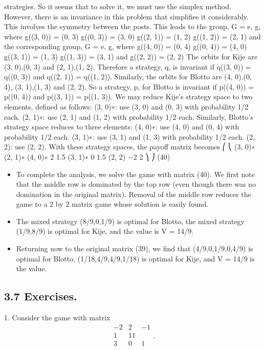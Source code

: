\documentclass[]{report}
\begin{document}
strategies. So it seems that to solve it, we must use the simplex method. However, there is
an invariance in this problem that simplifies it considerably. This involves the symmetry
between the posts. This leads to the group, G = {e, g}, where
g((3, 0)) = (0, 3) g((0, 3)) = (3, 0) g((2, 1)) = (1, 2) g((1, 2)) = (2, 1)
and the corresponding group, G = {e, g}, where
g((4, 0)) = (0, 4) g((0, 4)) = (4, 0) g((3, 1)) = (1, 3) g((1, 3)) = (3, 1)
and g((2, 2)) = (2, 2)
The orbits for Kije are {(3, 0),(0, 3)} and {(2, 1),(1, 2)}. Therefore a strategy, q, is
invariant if q((3, 0)) = q((0, 3)) and q((2, 1)) = q((1, 2)). Similarly, the orbits for Blotto
are {(4, 0),(0, 4)}, {(3, 1),(1, 3)} and {(2, 2)}. So a strategy, p, for Blotto is invariant if
p((4, 0)) = p((0, 4)) and p((3, 1)) = p((1, 3)).
We may reduce Kije’s strategy space to two elements, defined as follows:
(3, 0)∗: use (3, 0) and (0, 3) with probability 1/2 each.
(2, 1)∗: use (2, 1) and (1, 2) with probability 1/2 each.
Similarly, Blotto’s strategy space reduces to three elements:
(4, 0)∗: use (4, 0) and (0, 4) with probability 1/2 each.
(3, 1)∗: use (3, 1) and (1, 3) with probability 1/2 each.
(2, 2): use (2, 2).
With these strategy spaces, the payoff matrix becomes
⎛
⎝
(3, 0)∗ (2, 1)∗
(4, 0)∗ 2 1.5
(3, 1)∗ 0 1.5
(2, 2) −2 2
⎞
⎠ (40)
\begin{itemize}
\itemAs an example of the computations used to arrive at these payoffs, consider the upper
left entry. If Blotto uses (4,0) and (0,4) with probability 1/2 each, and if Kije uses (3,0)
and (0,3) with probability 1/2 each, then the four corners of the matrix (39) occur with
probability 1/4 each, so the expected payoff is the average of the four numbers, 4, 0, 0, 4,
namely 2.
\item To complete the analysis, we solve the game with matrix (40). We first note that
the middle row is dominated by the top row (even though there was no domination in the
original matrix). Removal of the middle row reduces the game to a 2 by 2 matrix game
whose solution is easily found. 
\item The mixed strategy (8/9,0,1/9) is optimal for Blotto, the
mixed strategy (1/9,8/9) is optimal for Kije, and the value is V = 14/9.
\item Returning now to the original matrix (39), we find that (4/9,0,1/9,0,4/9) is optimal
for Blotto, (1/18,4/9,4/9,1/18) is optimal for Kije, and V = 14/9 is the value.
\end{itemize}
\subsection{3.7 Exercises.}
1. Consider the game with matrix
\[\begin{array}{ccc}
−2 & 2 & −1\\
1& 1 1\\
3& 0& 1 \\
\end{array}.\]
\end{document}
